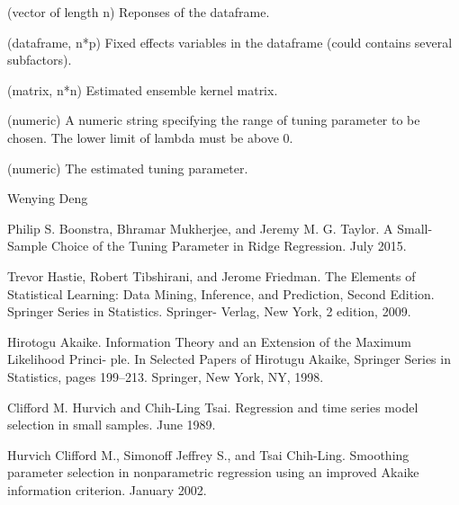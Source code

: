 \documentclass[a4paper]{book}
\begin{document}
\begin{Arguments}
\begin{ldescription}
\item[\code{Y}] (vector of length n) Reponses of the dataframe.

\item[\code{X}] (dataframe, n*p) Fixed effects variables in the dataframe (could
contains several subfactors).

\item[\code{K\_mat}] (matrix, n*n) Estimated ensemble kernel matrix.

\item[\code{lambda}] (numeric) A numeric string specifying the range of tuning parameter 
to be chosen. The lower limit of lambda must be above 0.
\end{ldescription}
\end{Arguments}
%
\begin{Details}\relax
{}

\end{Details}
%
\begin{Value}
\begin{ldescription}
\item[\code{lambda0}] (numeric) The estimated tuning parameter.
\end{ldescription}
\end{Value}
%
\begin{Author}\relax
Wenying Deng
\end{Author}
%
\begin{References}\relax
Philip S. Boonstra, Bhramar Mukherjee, and Jeremy M. G. Taylor.
A Small-Sample Choice of the Tuning Parameter in Ridge Regression. July
2015.

Trevor Hastie, Robert Tibshirani, and Jerome Friedman. The Elements of
Statistical Learning: Data Mining, Inference, and Prediction, Second
Edition. Springer Series in Statistics. Springer- Verlag, New York, 2
edition, 2009.

Hirotogu Akaike. Information Theory and an Extension of the Maximum
Likelihood Princi- ple. In Selected Papers of Hirotugu Akaike, Springer
Series in Statistics, pages 199–213. Springer, New York, NY, 1998.

Clifford M. Hurvich and Chih-Ling Tsai. Regression and time series model
selection in small samples. June 1989.

Hurvich Clifford M., Simonoff Jeffrey S., and Tsai Chih-Ling. Smoothing
parameter selection in nonparametric regression using an improved Akaike
information criterion. January 2002.
\end{References}
\end{document}
